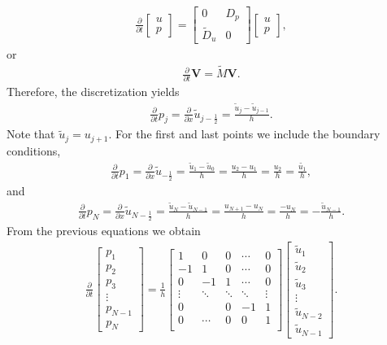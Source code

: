 \begin{align*}
\frac{\partial}{\partial t}\begin{bmatrix} u \\ p \end{bmatrix}=\begin{bmatrix} 0 & D_p\\ \tilde{D}_u & 0\end{bmatrix}\begin{bmatrix} u \\ p \end{bmatrix},
\end{align*}
or
\begin{align*}
\frac{\partial}{\partial t}\textbf{V}=\tilde{M}\textbf{V}.
\end{align*}
Therefore, the discretization yields
\begin{align*}
\frac{\partial}{\partial t}p_j=\frac{\partial}{\partial x}\tilde{u}_{j-\frac{1}{2}}=\frac{\tilde{u}_{j}-\tilde{u}_{j-1}}{h}.
\end{align*}
Note that $\tilde{u}_j=u_{j+1}$. For the first and last points we include the boundary conditions,
\begin{align*}
\frac{\partial}{\partial t}p_1=\frac{\partial}{\partial x}\tilde{u}_{-\frac{1}{2}}=\frac{\tilde{u}_{1}-\tilde{u}_{0}}{h}=\frac{u_{2}-u_{1}}{h}=\frac{u_2}{h}=\frac{\tilde{u_1}}{h},
\end{align*}
and
\begin{align*}
\frac{\partial}{\partial t}p_N=\frac{\partial}{\partial x}\tilde{u}_{N-\frac{1}{2}}=\frac{\tilde{u}_{N}-\tilde{u}_{N-1}}{h}=\frac{u_{N+1}-u_{N}}{h}=\frac{-u_{N}}{h}=-\frac{\tilde{u}_{N-1}}{h}.
\end{align*}
From the previous equations we obtain
\begin{align*}
\frac{\partial}{\partial t}\begin{bmatrix} p_1 \\ p_2 \\p_3\\ \vdots \\p_{N-1}\\p_N \end{bmatrix}=\frac{1}{h}\begin{bmatrix}
1 & 0 & 0 & \cdots & 0\\
-1 & 1 & 0 & \cdots & 0\\
0 & -1 & 1 & \cdots & 0\\
\vdots & \ddots & \ddots & \ddots  & \vdots\\
0 & & 0 & -1 & 1 \\
0 & \cdots & 0 & 0 & 1\\
\end{bmatrix} \begin{bmatrix} \tilde{u}_1 \\ \tilde{u}_2 \\\tilde{u}_3\\ \vdots \\\tilde{u}_{N-2}\\\tilde{u}_{N-1} \end{bmatrix}.
\end{align*}
